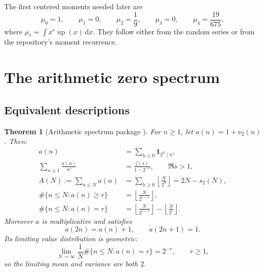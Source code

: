 \documentclass[11pt]{article}
\numberwithin{equation}{section}
\newtheorem{theorem}{Theorem}[section]
\theoremstyle{definition}
\theoremstyle{remark}
\newcommand{\Up}{\operatorname{up}}
\newcommand{\dd}{\,\mathrm d}
\newcommand{\floor}[1]{\left\lfloor#1\right\rfloor}
\begin{document}
The first centered moments needed later are
\begin{equation}
 \mu_0=1,\qquad \mu_1=0,\qquad \mu_2=\frac19,
 \qquad \mu_3=0,\qquad \mu_4=\frac{19}{675},               \label{p2:eq:moments}
\end{equation}
where $\mu_r=\int x^r\Up(x)\dd x$.  They follow either from the random series or
from the repository's moment recurrence.

\section{The arithmetic zero spectrum}
\label{p2:sec:spectrum}

\subsection{Equivalent descriptions}

\begin{theorem}[Arithmetic spectrum package \NewResult]
\label{p2:thm:spectrum-package}
For $n\ge1$, let $a(n)=1+\nu_2(n)$.  Then:
\begin{align}
 a(n)&=\sum_{h\ge0}\mathbf 1_{2^h\mid n},                  \label{p2:eq:a-divisor}\\
 \sum_{n\ge1}\frac{a(n)}{n^s}
   &=\frac{\zeta(s)}{1-2^{-s}},\qquad \Re s>1,             \label{p2:eq:D}\\
 A(N):=\sum_{n\le N}a(n)
   &=\sum_{h\ge0}\floor{\frac{N}{2^h}}
     =2N-s_2(N),                                           \label{p2:eq:AN}\\
 \#\{n\le N:a(n)\ge r\}
   &=\floor{\frac{N}{2^{r-1}}},                            \label{p2:eq:tail-count}\\
 \#\{n\le N:a(n)=r\}
   &=\floor{\frac{N}{2^{r-1}}}-
     \floor{\frac{N}{2^r}}.                               \label{p2:eq:exact-count}
\end{align}
Moreover $a$ is multiplicative and satisfies
\begin{equation}
 a(2n)=a(n)+1,\qquad a(2n+1)=1.                            \label{p2:eq:a-rec}
\end{equation}
Its limiting value distribution is geometric:
\begin{equation}
 \lim_{N\to\infty}\frac1N\#\{n\le N:a(n)=r\}=2^{-r},
 \qquad r\ge1,                                            \label{p2:eq:geom}
\end{equation}
so the limiting mean and variance are both $2$.
\end{theorem}
\end{document}

